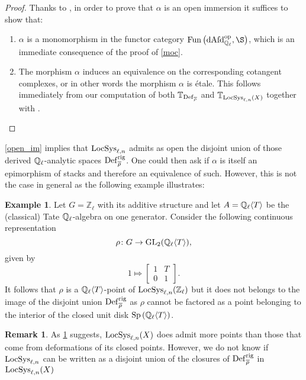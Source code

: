 \documentclass[10pt,a4paper]{amsart}
\numberwithin{equation}{subsection}
\theoremstyle{plain}
\theoremstyle{definition}
\newtheorem{exem}[theorem]{Example}
\newtheorem{rema}[theorem]{Remark}
\theoremstyle{remark}
\numberwithin{equation}{section}
\begin{document}
\begin{proof}
Thanks to \cite{need reference here}, in order to prove that $\alpha$ is an open immersion it suffices to show that:
	\begin{enumerate}
		\item $\alpha$ is a monomorphism in the functor category $\mathrm{Fun} \left( \mathrm{dAfd}_{\Q_\ell}^{\op}, \S \right)$, which is an immediate consequence of the proof of \cref{moc}.
		\item The morphism $\alpha$ induces an equivalence on the corresponding cotangent complexes, or in other words the morphism $\alpha$ is \'etale. This follows immediately from our computation of both
			$\mathbb T_{\mathbf{\mathrm{Def}}_{\overline{\rho}}}$ and $\mathbb T_{\mathrm{LocSys}_{\ell, n}(X)}$ together with \cite[Proposition 4.4.15.]{me1}.
	\end{enumerate}
\end{proof} 

\cref{open_im} implies that $\mathrm{LocSys}_{\ell, n}$ admits as open the disjoint union of those derived $\mathbb{Q}_{\ell}$-analytic spaces $\mathbf{\mathrm{Def}}_{\overline{\rho}}^{\mathrm{rig}}$. One could then ask if $\alpha$ is itself an epimorphism of stacks and therefore an equivalence of such. However,
this is not the case in general as the following example illustrates:


\begin{exem} \label{ex_surj}
Let $G = \mathbb Z_{\ell}$ with its additive structure and let $A = \mathbb{Q}_{\ell} \langle T \rangle$ be the (classical) Tate $\mathbb{Q}_{\ell}$-algebra on one generator. Consider the following continuous representation
	\[
		\rho \colon G \to \mathrm{GL}_2 (\mathbb{Q}_{\ell} \langle T \rangle),
	\]
given by
	\[
		1 \Mapsto 
		\begin{bmatrix}
			1 & T \\
			0 & 1
		\end{bmatrix}.
	\]
It follows that $\rho$ is a $\mathbb{Q}_{\ell} \langle T \rangle$-point of $\mathrm{LocSys}_{\ell, n}( \mathbb Z_{\ell})$ but it does not belongs to the image of the disjoint union $\mathbf{\mathrm{Def}}^{\mathrm{rig}}_{\overline{\rho}}$ as $\rho$ cannot be factored as a point belonging to the interior of the closed unit disk
$\mathrm{Sp} \left( 	\mathbb{Q}_{\ell} \langle T \rangle 		\right)$.
\end{exem}

\begin{rema}
As \cref{ex_surj} suggests, $\mathrm{LocSys}_{\ell, n}(X)$ does admit more points than those that come from deformations of its closed points. However, we do not know if $\mathrm{LocSys}_{\ell, n}$ can be written as a disjoint union of the closures of $\mathbf{\mathrm{Def}}^{\mathrm{rig}}_{\overline{\rho}}$ in
$\mathrm{LocSys}_{\ell, n}(X)$
\end{rema}
\end{document}
